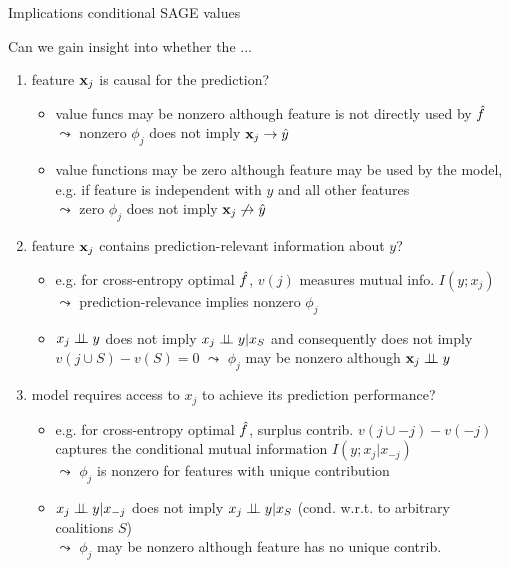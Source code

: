 \documentclass[10pt,compress,t,notes=noshow, xcolor=table]{beamer}
\begin{document}
\begin{frame}{Implications conditional SAGE values}

Can we gain insight into whether the ...

\begin{enumerate}
    \item<1> feature $\mathbf{x}_j$ is causal for the prediction?
    \begin{itemize}
      \item value funcs may be nonzero although feature is not directly used by $\hat{f}$\\
      $\leadsto$ nonzero $\phi_j$ does not imply $\mathbf{x}_j \rightarrow \hat{y}$
      \item value functions may be zero although feature may be used by the model, e.g. if feature is independent with $y$ and all other features \\ $\leadsto$ zero $\phi_j$ does not imply $\mathbf{x}_j \not \rightarrow \hat{y}$
    \end{itemize}
    \item<2> feature $\mathbf{x}_j$ contains prediction-relevant information about $y$?
    \begin{itemize}
      \item e.g. for cross-entropy optimal $\hat{f}$, $v(j)$ measures mutual info. $I(y;x_j)$
      $\leadsto$ prediction-relevance implies nonzero $\phi_j$
      \item $x_j \perp \!\!\! \perp y$ does not imply $x_j \perp \!\!\! \perp y | x_S$ and consequently does not imply $v(j \cup S) - v(S) = 0$
      $\leadsto$ $\phi_j$ may be nonzero although $\mathbf{x}_j \perp \!\!\! \perp y$
    \end{itemize}
    \item<3> model requires access to $x_j$ to achieve its prediction performance?  
    \begin{itemize}
        \item e.g. for cross-entropy optimal $\hat{f}$, surplus contrib. $v(j \cup -j) - v(-j)$ captures the conditional mutual information $I(y;x_j|x_{-j})$\\
        $\leadsto$ $\phi_j$ is nonzero for features with unique contribution
        \item $x_j \perp \!\!\! \perp y | x_{-j}$ does not imply $x_j \perp \!\!\! \perp y | x_S$ (cond. w.r.t. to arbitrary coalitions $S$)\\
        $\leadsto$ $\phi_j$ may be nonzero although feature has no unique contrib.
    \end{itemize}
\end{enumerate}

\end{frame}
\end{document}
